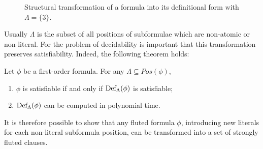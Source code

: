 \begin{figure}[H]
  \centering
  \begin{minipage}[t]{.3\textwidth}
  \end{minipage}
  \begin{minipage}[t]{.3\textwidth}
  \end{minipage}
  \caption{Structural transformation of a formula into its definitional form with \(\Lambda = \{3\}\).}\label{fig:definitional-form}
\end{figure}

Usually \(\Lambda\) is the subset of all positions of subformulae which are non-atomic or non-literal.
For the problem of decidability is important that this transformation preserves satisfiability. Indeed, the following theorem holds:

\begin{theorem}\label{thm:definitional-sat-preservation}
  Let \(\phi\) be a first-order formula. For any \(\Lambda \subseteq Pos(\phi)\),
  \begin{enumerate}
    \item \(\phi\) is satisfiable if and only if \(\fldef{\Lambda}{\phi}\) is satisfiable;
    \item \(\fldef{\Lambda}{\phi}\) can be computed in polynomial time.
  \end{enumerate}
\end{theorem} 
It is therefore possible to show that any fluted formula \(\phi\), introducing new literals for each non-literal subformula position, can be transformed into a set of strongly fluted clauses.

